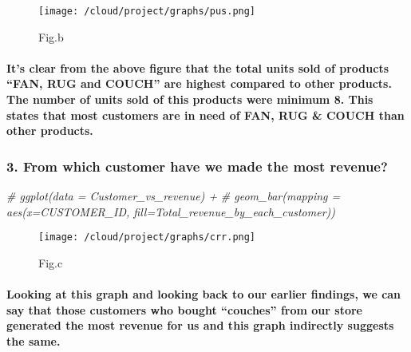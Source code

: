 \documentclass[
]{article}
\newenvironment{Shaded}{\begin{snugshade}}{\end{snugshade}}
\newcommand{\CommentTok}[1]{\textcolor[rgb]{0.56,0.35,0.01}{\textit{#1}}}
\begin{document}
\begin{figure}
\centering
\texttt{[image: /cloud/project/graphs/pus.png]}
\caption{Fig.b}
\end{figure}

\hypertarget{its-clear-from-the-above-figure-that-the-total-units-sold-of-products-fan-rug-and-couch-are-highest-compared-to-other-products.-the-number-of-units-sold-of-this-products-were-minimum-8.-this-states-that-most-customers-are-in-need-of-fan-rug-couch-than-other-products.}{%
\paragraph{It's clear from the above figure that the total units sold of
products ``FAN, RUG and COUCH'' are highest compared to other products.
The number of units sold of this products were minimum 8. This states
that most customers are in need of FAN, RUG \& COUCH than other
products.}\label{its-clear-from-the-above-figure-that-the-total-units-sold-of-products-fan-rug-and-couch-are-highest-compared-to-other-products.-the-number-of-units-sold-of-this-products-were-minimum-8.-this-states-that-most-customers-are-in-need-of-fan-rug-couch-than-other-products.}}

\hypertarget{from-which-customer-have-we-made-the-most-revenue-1}{%
\subsubsection{3. From which customer have we made the most
revenue?}\label{from-which-customer-have-we-made-the-most-revenue-1}}

\begin{Shaded}
\begin{Highlighting}[]
\CommentTok{\# ggplot(data = Customer\_vs\_revenue) +}
\CommentTok{\#   geom\_bar(mapping = aes(x=CUSTOMER\_ID, fill=Total\_revenue\_by\_each\_customer))}
\end{Highlighting}
\end{Shaded}

\begin{figure}
\centering
\texttt{[image: /cloud/project/graphs/crr.png]}
\caption{Fig.c}
\end{figure}

\hypertarget{looking-at-this-graph-and-looking-back-to-our-earlier-findings-we-can-say-that-those-customers-who-bought-couches-from-our-store-generated-the-most-revenue-for-us-and-this-graph-indirectly-suggests-the-same.}{%
\paragraph{Looking at this graph and looking back to our earlier
findings, we can say that those customers who bought ``couches'' from
our store generated the most revenue for us and this graph indirectly
suggests the
same.}\label{looking-at-this-graph-and-looking-back-to-our-earlier-findings-we-can-say-that-those-customers-who-bought-couches-from-our-store-generated-the-most-revenue-for-us-and-this-graph-indirectly-suggests-the-same.}}
\end{document}
